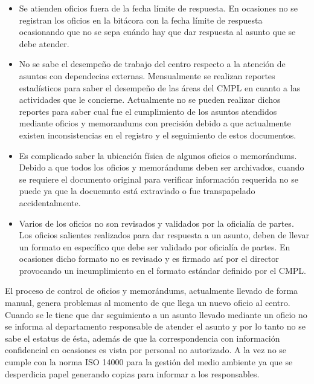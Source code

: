 \begin{itemize}
	\item Se atienden oficios fuera de la fecha límite de respuesta.
En ocasiones no se registran los oficios en la bitácora con la fecha límite de respuesta ocasionando que no se sepa cuándo hay que dar respuesta al asunto que se debe atender.	
	
	\item No se sabe el desempeño de trabajo del centro respecto a la atención de asuntos con dependecias externas.
Mensualmente se realizan reportes estadísticos para saber el desempeño de las áreas del CMPL en cuanto a las actividades que le concierne. Actualmente no se pueden realizar dichos reportes para saber cual fue el cumplimiento de los asuntos atendidos mediante oficios y memorandums con precisión debido a que actualmente existen inconsistencias en el registro y el seguimiento de estos documentos.
	
	\item Es complicado saber la ubicación física de algunos oficios o memorándums. %
Debido a que todos los oficios y memorándums deben ser archivados, cuando se requiere el documento original para verificar información requerida no se puede ya que la docuemnto está extraviado o fue transpapelado accidentalmente.
	
	\item Varios de los oficios no son revisados y validados por la oficialía de partes.
Los oficios salientes realizados para dar respuesta a un asunto, deben de llevar un formato en específico que debe ser validado por oficialía de partes. En ocasiones dicho formato no es revisado y es firmado así por el director provocando un incumplimiento en el formato estándar definido por el CMPL.	
	\end{itemize}
	
El proceso de control de oficios y memorándums, actualmente llevado de forma manual, genera problemas al momento de que llega un nuevo oficio al centro. Cuando se le tiene que dar seguimiento a un asunto llevado mediante un oficio no se informa al departamento responsable de atender el asunto y por lo tanto no se sabe el estatus de ésta, además de que la correspondencia con información confidencial en ocasiones es vista por personal no autorizado. A la vez no se cumple con la norma ISO 14000 para la gestión del medio ambiente ya que se desperdicia papel generando copias para informar a los responsables.

